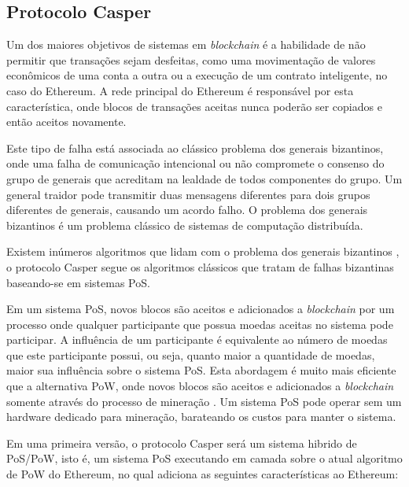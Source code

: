 \documentclass[tcc,capa]{texufpel}
\begin{document}
    \subsection{Protocolo Casper}
    
    Um dos maiores objetivos de sistemas em \textit{blockchain} é a habilidade de não permitir que transações sejam desfeitas, como uma movimentação de valores econômicos de uma conta a outra ou a execução de um contrato inteligente, no caso do Ethereum. A rede principal do Ethereum é responsável por esta característica, onde blocos de transações aceitas nunca poderão ser copiados e então aceitos novamente.
    
    Este tipo de falha está associada ao clássico problema dos generais bizantinos, onde uma falha de comunicação intencional ou não compromete o consenso do grupo de generais que acreditam na lealdade de todos componentes do grupo. Um general traidor pode transmitir duas mensagens diferentes para dois grupos diferentes de generais, causando um acordo falho. O problema dos generais bizantinos é um problema clássico de sistemas de computação distribuída.
    
    Existem inúmeros algoritmos que lidam com o problema dos generais bizantinos \cite{coulouris}, o protocolo Casper segue os algoritmos clássicos que tratam de falhas bizantinas baseando-se em sistemas PoS.
    
    Em um sistema PoS, novos blocos são aceitos e adicionados a \textit{blockchain} por um processo onde qualquer participante que possua moedas aceitas no sistema pode participar. A influência de um participante é equivalente ao número de moedas que este participante possui, ou seja, quanto maior a quantidade de moedas, maior sua influência sobre o sistema PoS. Esta abordagem é muito mais eficiente que a alternativa PoW, onde novos blocos são aceitos e adicionados a \textit{blockchain} somente através do processo de mineração \cite{buterin2017}. Um sistema PoS pode operar sem um hardware dedicado para mineração, barateando os custos para manter o sistema.
    
    Em uma primeira versão, o protocolo Casper será um sistema hibrido de PoS/PoW, isto é, um sistema PoS executando em camada sobre o atual algoritmo de PoW do Ethereum, no qual adiciona as seguintes características ao Ethereum:
    
\end{document}
